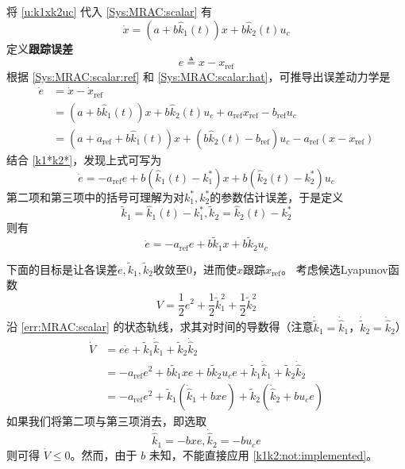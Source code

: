 将 \eqref{u:k1xk2uc} 代入 \eqref{Sys:MRAC:scalar} 有
\begin{equation}
  \dot{x} = (a + b \hat{k}_1 (t)) x + b \hat{k}_2 (t) u_c \label{Sys:MRAC:scalar:hat}
\end{equation}
定义{\bf 跟踪误差}
\begin{equation*}
  e \triangleq x - x_{\ensuremath{\operatorname{ref}}}
\end{equation*}
根据 \eqref{Sys:MRAC:scalar:ref} 和 \eqref{Sys:MRAC:scalar:hat}，可推导出误差动力学是
\begin{align}
  \dot{e} & = \dot{x} - \dot{x}_{\ensuremath{\operatorname{ref}}}
  \nonumber\\
  & = (a + b \hat{k}_1 (t)) x + b \hat{k}_2 (t) u_c +
  a_{\ensuremath{\operatorname{ref}}} x_{\ensuremath{\operatorname{ref}}} -
  b_{\ensuremath{\operatorname{ref}}} u_c \nonumber\\
  & = (a + a_{\ensuremath{\operatorname{ref}}} + b \hat{k}_1 (t)) x + (b
  \hat{k}_2 (t) - b_{\ensuremath{\operatorname{ref}}}) u_c -
  a_{\ensuremath{\operatorname{ref}}} (x - x_{\ensuremath{\operatorname{ref}}}) \nonumber
\end{align}
结合 \eqref{k1*k2*}，发现上式可写为
\[\dot{e} = - a_{\ensuremath{\operatorname{ref}}} e + b (\hat{k}_1(t)-k^{\ast}_1) x + b (\hat{k}_2 (t) - k^{\ast}_2) u_c\]
第二项和第三项中的括号可理解为对$k^{\ast}_1,k^{\ast}_2$的参数估计误差，于是定义
\[\tilde{k}_1 = \hat{k}_1 (t) - k^{\ast}_1,\tilde{k}_2 = \hat{k}_2
(t) - k^{\ast}_2\]则有
\begin{equation}
  \dot{e} = - a_{\ensuremath{\operatorname{ref}}} e + b \tilde{k}_1 x + b 
  \tilde{k}_2 u_c  \label{err:MRAC:scalar}
\end{equation}

下面的目标是让各误差$e,\tilde{k}_1,\tilde{k}_2$收敛至$0$，进而使$x$跟踪$x_\mathrm{ref}$。
考虑候选Lyapunov函数
\begin{equation}
  V = \frac{1}{2} e^2 + \frac{1}{2} \tilde{k}^2_1 + \frac{1}{2} \tilde{k}^2_2\label{not_implement_candidate}
\end{equation}
沿 \eqref{err:MRAC:scalar} 的状态轨线，求其对时间的导数得（注意$\dot{\tilde{k}}_1=\dot{\hat{k}}_1$，$\dot{\tilde{k}}_2=\dot{\hat{k}}_2$）
\begin{align}
  \dot{V} & = e  \dot{e} + \tilde{k} _1 \dot{\hat{k}}_1 + \tilde{k} _2
  \dot{\hat{k}}_2 \nonumber\\
  & = - a_{\ensuremath{\operatorname{ref}}} e^2 + b \tilde{k} _1 x  e + b
  \tilde{k} _2 u_c e + \tilde{k} _1 \dot{\hat{k}}_1 + \tilde{k} _2
  \dot{\hat{k}}_2 \nonumber\\
  & = - a_{\ensuremath{\operatorname{ref}}} e^2 + \tilde{k} _1
  (\dot{\hat{k}}_1 + b  x  e) + \tilde{k} _2 (\dot{\hat{k}}_2 + b  u_c e) \label{not_implement_vdot}
\end{align}
如果我们将第二项与第三项消去，即选取
\begin{equation}
  \dot{\hat{k}}_1 = - b  x  e, \dot{\hat{k}}_2 = - b  u_c e
  \label{k1k2:not:implemented}
\end{equation}
则可得 $\dot{V} \leq 0$。然而，由于 $b$ 未知，不能直接应用 \eqref{k1k2:not:implemented}。

